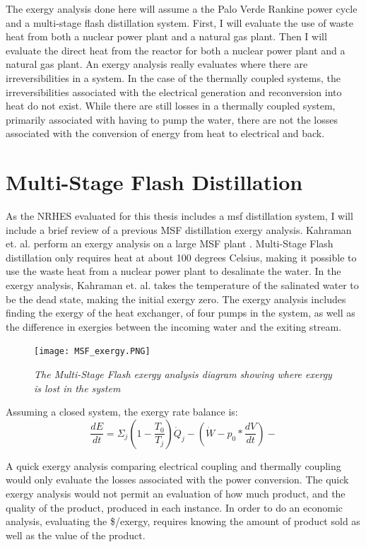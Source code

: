 \documentclass[12pt]{UIdahoMastersThesis}
\begin{document}
 The exergy analysis done here will assume a the Palo Verde Rankine power cycle and a multi-stage flash distillation system.  First, I will evaluate the use of waste heat from both a nuclear power plant and a natural gas plant.  Then I will evaluate the direct heat from the reactor for both a nuclear power plant and a natural gas plant. An exergy analysis really evaluates where there are irreversibilities in a system.  In the case of the thermally coupled systems, the irreversibilities associated with the electrical generation and reconversion into heat do not exist.  While there are still losses in a thermally coupled system, primarily associated with having to pump the water, there are not the losses associated with the conversion of energy from heat to electrical and back.


\section{Multi-Stage Flash Distillation}
As the NRHES evaluated for this thesis includes a \ac{msf} distillation system, I will include a brief review of a previous MSF distillation exergy analysis. Kahraman et. al. perform an exergy analysis on a large MSF plant \cite{Kahraman2005}.  Multi-Stage Flash distillation only requires heat at about 100 degrees Celsius, making it possible to use the waste heat from a nuclear power plant to desalinate the water. In the exergy analysis, Kahraman et. al. takes the temperature of the salinated water to be the dead state, making the initial exergy zero. The exergy analysis includes finding the exergy of the heat exchanger, of four pumps in the system, as well as the difference in exergies between the incoming water and the exiting stream.

\begin{figure}
\texttt{[image: MSF\_exergy.PNG]}
\caption{\small \sl The Multi-Stage Flash exergy analysis diagram showing where exergy is lost in the system}
\end{figure}


	Assuming a closed system, the exergy rate balance is:
\begin{equation}
\frac{dE}{dt}=\Sigma_j(1-\frac{T_0}{T_j})\dot{Q}_j-(\dot{W}-p_0*\frac{dV}{dt})-
\end{equation}

A quick exergy analysis comparing electrical coupling and thermally coupling would only evaluate the losses associated with the power conversion.  The quick exergy analysis would not permit an evaluation of how much product, and the quality of the product, produced in each instance. In order to do an economic analysis, evaluating the \$/exergy, requires knowing the amount of product sold as well as the value of the product.
\end{document}
